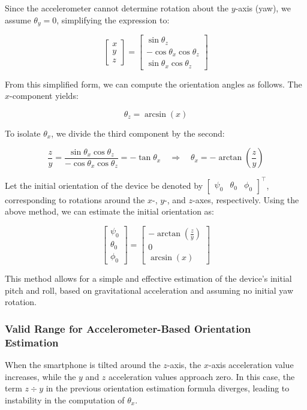 \documentclass{article}
\begin{document}
Since the accelerometer cannot determine rotation about the $y$-axis (yaw), we assume $\theta_y = 0$, simplifying the expression to:

\[
\begin{bmatrix}
x\\
y\\
z
\end{bmatrix}
=
\begin{bmatrix}
\sin\theta_z \\
-\cos\theta_x \cos\theta_z \\
\sin\theta_x \cos\theta_z
\end{bmatrix}
\]

From this simplified form, we can compute the orientation angles as follows. The $x$-component yields:

\[
\theta_z = \arcsin(x)
\]

To isolate $\theta_x$, we divide the third component by the second:

\[
\frac{z}{y} = \frac{\sin\theta_x \cos\theta_z}{-\cos\theta_x \cos\theta_z} = -\tan\theta_x \quad \Rightarrow \quad \theta_x = -\arctan\left(\frac{z}{y}\right)
\]

Let the initial orientation of the device be denoted by $\begin{bmatrix} \psi_0 & \theta_0 & \phi_0 \end{bmatrix}^\top$, corresponding to rotations around the $x$-, $y$-, and $z$-axes, respectively. Using the above method, we can estimate the initial orientation as:

\[
\begin{bmatrix}
\psi_0 \\
\theta_0 \\
\phi_0
\end{bmatrix}
=
\begin{bmatrix}
-\arctan\left(\frac{z}{y}\right) \\
0 \\
\arcsin(x)
\end{bmatrix}
\]

This method allows for a simple and effective estimation of the device’s initial pitch and roll, based on gravitational acceleration and assuming no initial yaw rotation.

\subsubsection{Valid Range for Accelerometer-Based Orientation Estimation}

When the smartphone is tilted around the $z$-axis, the $x$-axis acceleration value increases, while the $y$ and $z$ acceleration values approach zero. In this case, the term $z \div y$ in the previous orientation estimation formula diverges, leading to instability in the computation of $\theta_x$.
\end{document}
